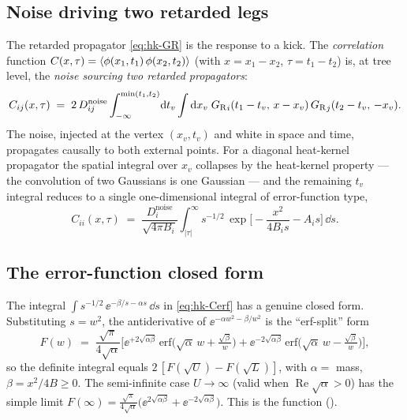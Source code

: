 \subsection{Noise driving two retarded legs}

The retarded propagator \eqref{eq:hk-GR} is the response to a kick. The
\emph{correlation} function $C(x,\tau)=\left\langle \phi(x_1,t_1)\,\phi(x_2,t_2) \right\rangle$ (with
$x=x_1-x_2$, $\tau=t_1-t_2$) is, at tree level, the \emph{noise sourcing two
retarded propagators}:
\begin{equation}
  C_{ij}(x,\tau) \;=\; 2\,D^{\text{noise}}_{ij}
  \int_{-\infty}^{\min(t_1,t_2)}\!\mathrm{d} t_v \int \mathrm{d} x_v\;
  {G_{\mathrm R}}_i(t_1-t_v,\,x-x_v)\,{G_{\mathrm R}}_j(t_2-t_v,\,-x_v).
  \label{eq:hk-Ctwoleg}
\end{equation}
The noise, injected at the vertex $(x_v,t_v)$ and white in space and time,
propagates causally to both external points. For a diagonal heat-kernel
propagator the spatial integral over $x_v$ collapses by the heat-kernel
 property --- the convolution of two Gaussians is one Gaussian
--- and the remaining $t_v$ integral reduces to a single one-dimensional
integral of error-function type,
\begin{equation}
  C_{ii}(x,\tau) \;=\; \frac{D^{\text{noise}}_i}{\sqrt{4\pi B_i}}
  \int_{|\tau|}^{\infty} s^{-1/2}\,
  \exp\!\Big[-\frac{x^{2}}{4 B_i s} - A_i s\Big]\,\dd s.
  \label{eq:hk-Cerf}
\end{equation}

\subsection{The error-function closed form}

The integral $\int s^{-1/2}\,\ee^{-\beta/s - \alpha s}\,\dd s$ in
\eqref{eq:hk-Cerf} has a genuine closed form. Substituting $s=w^{2}$, the
antiderivative of $\ee^{-\alpha w^{2} - \beta/w^{2}}$ is the ``erf-split'' form
\begin{equation}
  F(w) \;=\; \frac{\sqrt\pi}{4\sqrt\alpha}\Big[
    \ee^{+2\sqrt{\alpha\beta}}\,\mathrm{erf}\!\big(\sqrt\alpha\,w + \tfrac{\sqrt\beta}{w}\big)
    + \ee^{-2\sqrt{\alpha\beta}}\,\mathrm{erf}\!\big(\sqrt\alpha\,w - \tfrac{\sqrt\beta}{w}\big)
  \Big],
  \label{eq:hk-Fw}
\end{equation}
so the definite integral equals $2\,[F(\sqrt{U})-F(\sqrt{L})]$, with
$\alpha=$ mass, $\beta=x^{2}/4B\ge 0$. The semi-infinite case $U\to\infty$
(valid when $\operatorname{Re}\sqrt\alpha>0$) has the simple limit
$F(\infty)=\tfrac{\sqrt\pi}{4\sqrt\alpha}\big(\ee^{2\sqrt{\alpha\beta}}+\ee^{-2\sqrt{\alpha\beta}}\big)$.
This is the function  ().

